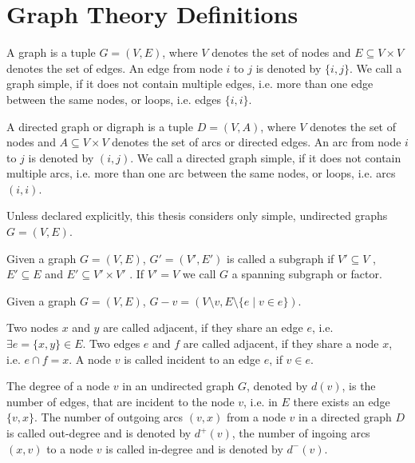 \section{Graph Theory Definitions}
\begin{definition}[Graph]
A graph is a tuple $G = (V, E)$, where $V$ denotes the set of nodes and $E \subseteq V \times V$ denotes the set of edges. An edge from node $i$ to $j$ is denoted by $\{i, j\}$. We call a graph simple, if it does not contain multiple edges, i.e. more than one edge between the same nodes, or loops, i.e. edges $\{i, i\}$.
\end{definition}
\begin{definition}
A directed graph or digraph is a tuple $D = (V, A)$, where $V$ denotes the set of nodes and $A \subseteq V \times V$ denotes the set of arcs
or directed edges. An arc from node $i$ to $j$ is denoted by $(i, j)$. We call a directed graph simple, if it does not contain multiple arcs, i.e. more than one arc between the same nodes, or loops, i.e. arcs $(i, i)$.
\end{definition}
Unless declared explicitly, this thesis considers only simple, undirected graphs $G = (V, E)$.
\begin{definition}
Given a graph $G = (V, E)$, $G' = (V', E')$ is called a subgraph if $V' \subseteq V$ , $E' \subseteq E$ and $E' \subseteq V' \times V'$ . If  $V' = V$ we call $G$ a spanning subgraph or factor.
\end{definition}
\begin{definition}
Given a graph $G = (V, E)$, $G - v = (V \setminus v, E \setminus \{e \mid v \in e\})$.
\end{definition}
\begin{definition}
Two nodes $x$ and $y$ are called adjacent, if they share an edge $e$, i.e. $\exists e = \{x, y\} \in E$. Two edges $e$ and $f$ are called adjacent, if they share a node $x$, i.e. $e \cap f = x$. A node $v$ is called incident to an edge $e$, if $v \in e$.
\end{definition}
\begin{definition}
The degree of a node $v$ in an undirected graph $G$, denoted by $d(v)$, is the number of edges, that are incident to the node $v$, i.e. in $E$ there exists an edge $\{v, x\}$. The number of outgoing arcs $(v, x)$ from a node $v$ in a directed graph $D$ is called out-degree and is denoted by $d^+(v)$, the number of ingoing arcs $(x, v)$ to a node $v$ is called in-degree and is denoted by $d^-(v)$.
\end{definition}
